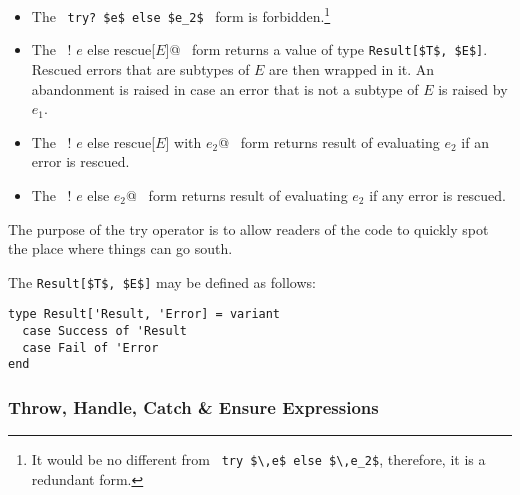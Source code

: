 \begin{itemize}
  \item The ~\lstinline!try? $e$ else $e_2$!~ form is forbidden.\footnote{It would be no different from ~\lstinline!try $\,e$ else $\,e_2$!, therefore, it is a redundant form.}
  
  \item The ~\lstinline@try! $e$ else rescue[$E$]@~ form returns a value of type \lstinline!Result[$T$, $E$]!. Rescued errors that are subtypes of $E$ are then wrapped in it. An abandonment is raised in case an error that is not a subtype of $E$ is raised by $e_1$.
      
  \item The ~\lstinline@try! $e$ else rescue[$E$] with $e_2$@~ form returns result of evaluating $e_2$ if an error is rescued. 
        
  \item The ~\lstinline@try! $e$ else $e_2$@~ form returns result of evaluating $e_2$ if any error is rescued. 
\end{itemize}

The purpose of the try operator is to allow readers of the code to quickly spot the place where things can go south.

The \lstinline!Result[$T$, $E$]! may be defined as follows:
\begin{lstlisting}
type Result['Result, 'Error] = variant
  case Success of 'Result
  case Fail of 'Error
end
\end{lstlisting}





\subsubsection{Throw, Handle, Catch \& Ensure Expressions}
\label{sec:throw-catch-expressions}

